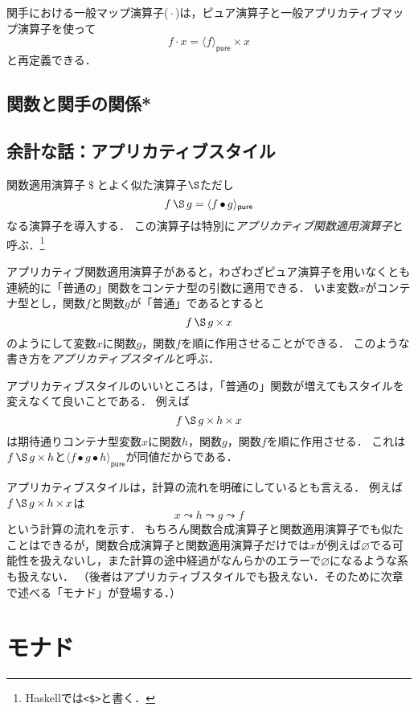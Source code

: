 \documentclass[twocolumn]{jsbook}
\newcommand{\keyword}[1]{{\emph{#1}}}
\newcommand{\code}[1]{\texttt{#1}}
\DeclareMathOperator{\hsklApplicativeApply}{\S}
\DeclareMathOperator{\hsklApplicativeMap}{\times}
\DeclareMathOperator{\hsklFmap}{\cdot}
\newcommand{\hsklNothing}{\varnothing}
\newcommand{\hsklPure}[1]{\langle#1\rangle_\textsf{pure}}
\DeclareMathOperator{\mathApply}{\$}
\DeclareMathOperator{\mathCompose}{\bullet}
\begin{document}
関手における一般マップ演算子($\hsklFmap$)は，ピュア演算子と一般アプリカティブマップ演算子を使って$$f\hsklFmap x=\hsklPure{f}\hsklApplicativeMap x$$と再定義できる．



\section{関数と関手の関係*}

\section{余計な話：アプリカティブスタイル}

関数適用演算子$\mathApply$とよく似た演算子$\hsklApplicativeApply$ただし$$f\hsklApplicativeApply g=\hsklPure{f\mathCompose g}$$なる演算子を導入する．
この演算子は特別に\keyword{アプリカティブ関数適用演算子}と呼ぶ．\footnote{Haskellでは\code{<\$>}と書く．}

アプリカティブ関数適用演算子があると，わざわざピュア演算子を用いなくとも連続的に「普通の」関数をコンテナ型の引数に適用できる．
いま変数$x$がコンテナ型とし，関数$f$と関数$g$が「普通」であるとすると$$f\hsklApplicativeApply g\hsklApplicativeMap x$$のようにして変数$x$に関数$g$，関数$f$を順に作用させることができる．
このような書き方を\keyword{アプリカティブスタイル}と呼ぶ．

アプリカティブスタイルのいいところは，「普通の」関数が増えてもスタイルを変えなくて良いことである．
例えば$$f\hsklApplicativeApply g\hsklApplicativeMap h\hsklApplicativeMap x$$は期待通りコンテナ型変数$x$に関数$h$，関数$g$，関数$f$を順に作用させる．
これは$f\hsklApplicativeApply g\hsklApplicativeMap h$と$\hsklPure{f\mathCompose g\mathCompose h}$が同値だからである．

アプリカティブスタイルは，計算の流れを明確にしているとも言える．
例えば$f\hsklApplicativeApply g\hsklApplicativeMap h\hsklApplicativeMap x$は$$x\leadsto h\leadsto g\leadsto f$$という計算の流れを示す．
もちろん関数合成演算子と関数適用演算子でも似たことはできるが，関数合成演算子と関数適用演算子だけでは$x$が例えば$\hsklNothing$でる可能性を扱えないし，また計算の途中経過がなんらかのエラーで$\hsklNothing$になるような系も扱えない．
（後者はアプリカティブスタイルでも扱えない．そのために次章で述べる「モナド」が登場する．）




\chapter{モナド}
\end{document}
